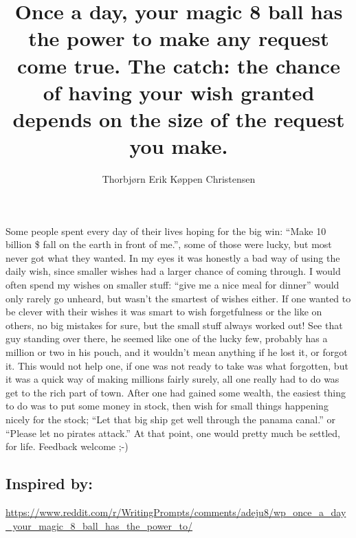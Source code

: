 \documentclass[oneside,english,onecolumn,openbib,a4paper]{memoir}
\title{Once a day, your magic 8 ball has the power to make any request come true. The catch: the chance of having your wish granted depends on the size of the request you make.}
\author{Thorbjørn Erik Køppen Christensen}
\begin{document}
\maketitle{}

Some people spent every day of their lives hoping for the big win: ``Make 10 billion \$ fall on the earth in front of me.'', some of those were lucky, but most never got what they wanted. 
In my eyes it was honestly a bad way of using the daily wish, since smaller wishes had a larger chance of coming through. 
I would often spend my wishes on smaller stuff: ``give me a nice meal for dinner'' would only rarely go unheard, but wasn't the smartest of wishes either.
If one wanted to be clever with their wishes it was smart to wish forgetfulness or the like on others, no big mistakes for sure, but the small stuff always worked out!
See that guy standing over there, he seemed like one of the lucky few, probably has a million or two in his pouch, and it wouldn't mean anything if he lost it, or forgot it. 
This would not help one, if one was not ready to take was what forgotten, but it was a quick way of making millions fairly surely, all one really had to do was get to the rich part of town.
After one had gained some wealth, the easiest thing to do was to put some money in stock, then wish for small things happening nicely for the stock; ``Let that big ship get well through the panama canal.'' or ``Please let no pirates attack.''
At that point, one would pretty much be settled, for life.
\newline\newline\newline
Feedback welcome ;-)

\subsection{Inspired by:}
\url{https://www.reddit.com/r/WritingPrompts/comments/adeju8/wp_once_a_day_your_magic_8_ball_has_the_power_to/}
\end{document}
